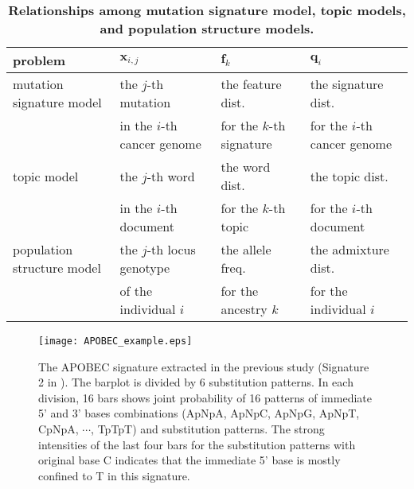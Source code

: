 \clearpage

\begin{table}[!ht]
\caption{
{\bf Relationships among mutation signature model, topic models, and population structure models.}
}
\begin{center}
\begin{tabular}{|l|l|l|l|} \hline
problem & $\bm{x}_{i,j}$ & $\bm{f}_{k}$ & $\bm{q}_{i}$  \\ \hline
mutation signature model & the $j$-th mutation  & the feature dist.  & the signature dist.  \\
& in the $i$-th cancer genome & for the $k$-th signature & for the $i$-th cancer genome \\ \hline
topic model &  the $j$-th word & the word dist. & the topic dist. \\ 
& in the $i$-th document & for the $k$-th topic & for the $i$-th document \\ \hline
population structure model & the $j$-th locus genotype & the allele freq.  & the admixture dist. \\
& of the individual $i$  & for the ancestry $k$ & for the individual $i$ \\
\hline 
\end{tabular}
\end{center}
\label{tab_pop}
\end{table}


\clearpage

\begin{figure*}[b]
\centering
\texttt{[image: APOBEC\_example.eps]}
\caption{The APOBEC signature extracted in the previous study (Signature 2 in \cite{pmid23945592}).
The barplot is divided by 6 substitution patterns.
In each division, 16 bars shows joint probability of 16 patterns of immediate 5' and 3' bases combinations 
(ApNpA, ApNpC, ApNpG, ApNpT, CpNpA, $\cdots$, TpTpT) and substitution patterns.
The strong intensities of the last four bars for the substitution patterns with original base C 
indicates that the immediate 5' base is mostly confined to T in this signature.
}
\label{APOBEC_example}
\end{figure*}

\clearpage

